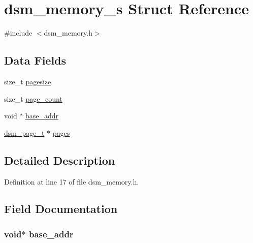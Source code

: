 \hypertarget{structdsm__memory__s}{}\section{dsm\+\_\+memory\+\_\+s Struct Reference}
\label{structdsm__memory__s}


{\ttfamily \#include $<$dsm\+\_\+memory.\+h$>$}

\subsection*{Data Fields}
\begin{DoxyCompactItemize}
\item 
size\+\_\+t \hyperlink{structdsm__memory__s_acf2100606c2cc3ac23a92214e8018a2d}{pagesize}
\item 
size\+\_\+t \hyperlink{structdsm__memory__s_aa0a18b4e3e172dc4a506562989bbaf70}{page\+\_\+count}
\item 
void $\ast$ \hyperlink{structdsm__memory__s_a11629c26d97d432db05d9355c37362d7}{base\+\_\+addr}
\item 
\hyperlink{dsm__memory_8h_a4532414cb6070e9c63306f5ca5afa152}{dsm\+\_\+page\+\_\+t} $\ast$ \hyperlink{structdsm__memory__s_a3889719ea29b7e6c479d5ecfef645cf4}{pages}
\end{DoxyCompactItemize}


\subsection{Detailed Description}


Definition at line 17 of file dsm\+\_\+memory.\+h.



\subsection{Field Documentation}
\subsubsection[{\texorpdfstring{base\+\_\+addr}{base_addr}}]{\setlength{\rightskip}{0pt plus 5cm}void$\ast$ base\+\_\+addr}\hypertarget{structdsm__memory__s_a11629c26d97d432db05d9355c37362d7}{}\label{structdsm__memory__s_a11629c26d97d432db05d9355c37362d7}


